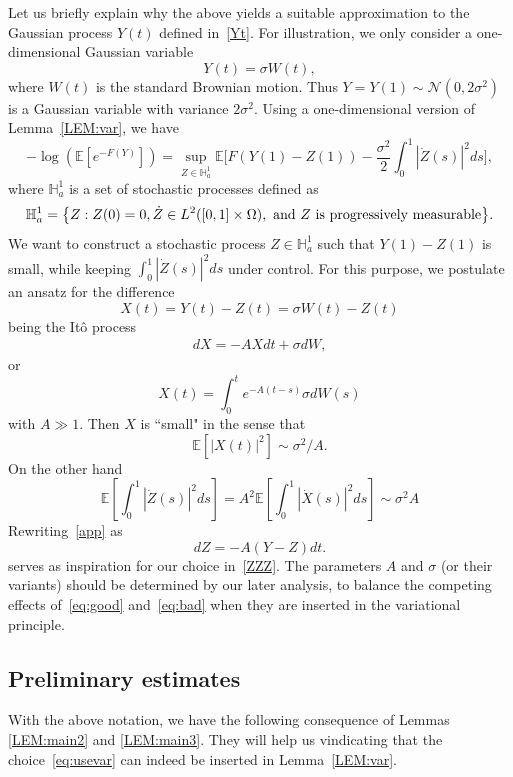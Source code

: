 \documentclass[%
11pt,  reqno]{amsart}
\theoremstyle{remarkstyle}
\newcommand{\1}{\hspace{0.2mm}\text{I}\hspace{0.2mm}}
\newcommand{\E}{\mathbb{E}}
\newcommand{\s}{\sigma}
\numberwithin{equation}{section}
\numberwithin{theorem}{section}
\begin{document}
	Let us briefly explain why the above yields a suitable approximation to the Gaussian process $Y(t)$ defined in~\eqref{Yt}. For illustration, we only consider a one-dimensional Gaussian variable 
	$$Y (t) = \sigma W(t),$$
	where $W(t)$ is the standard Brownian motion. Thus $Y = Y(1) \sim \mathcal N(0, 2\sigma^2)$ is a Gaussian variable with variance $2\sigma^2$. Using a one-dimensional version of Lemma~\ref{LEM:var}, we have
	\[
	-\log \left( \mathbb E [e^{-F(Y)}] \right) = \sup_{Z \in \mathbb H^1_a} \mathbb E \bigg[ F(Y(1) - Z(1)) - \frac{\sigma^2}2 \int_0^1 |\dot Z (s)|^2  ds\bigg], 
	\]
	where $\mathbb H_a^1$ is a set of stochastic processes defined as
	\[
	\mathbb H_a^1 = \big\{ Z: Z(0) = 0,  \dot Z \in L^2 ([0,1]\times \Omega), \textup{ and } Z \textup{ is progressively measurable} \big\}.
	\]
	We want to construct a stochastic process $Z \in \mathbb H_a^1$ such that $Y(1) - Z(1)$ is small, while keeping $\int_0^1 |\dot Z (s)|^2  ds$ under control. For this purpose, we postulate an ansatz for the difference 
	$$X (t) = Y(t) - Z(t) = \sigma W (t) - Z (t)$$
	being the It\^o process 
	\begin{align} \label{app}
		dX = - A X dt + \sigma dW,
	\end{align}
	or
	\[
	X(t) = \int_0^t e^{-A (t-s)} \sigma dW(s)
	\]
	with $A \gg 1$. Then  $X$ is ``small" in the sense that 
	\begin{equation}\label{eq:good}
		\E \left[|X(t)|^2\right] \sim \sigma^2/A. 
	\end{equation}
	On the other hand
	\begin{equation}\label{eq:bad}
		\E \left[ \int_0^1 |\dot Z (s)|^2  ds\right] = A^2 \E \left[ \int_0^1 |\dot X (s)|^2  ds\right] \sim \sigma^2 A 
	\end{equation}
	Rewriting~\eqref{app} as 
	\[
	dZ = - A (Y - Z) dt.
	\]
	serves as inspiration for our choice in~\eqref{ZZZ}. The parameters $A$ and $\s$ (or their variants) should be determined by our later analysis, to balance the competing effects of~\eqref{eq:good} and~\eqref{eq:bad} when they are inserted in the variational principle. 
	
	
	
	\subsection{Preliminary estimates}\label{sec:BouDup2}
	
	With the above notation, we have the following consequence of Lemmas \ref{LEM:main2} and \ref{LEM:main3}. They will help us vindicating that the choice~\eqref{eq:usevar} can indeed be inserted in Lemma~\ref{LEM:var}.
	
\end{document}
